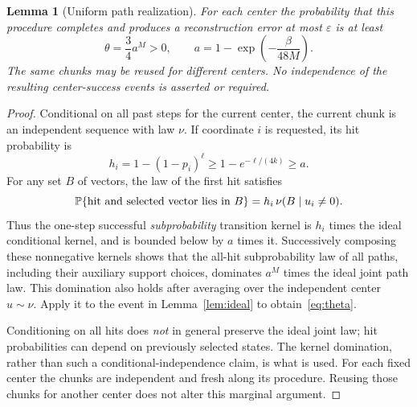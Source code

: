 \documentclass[11pt]{article}
\newtheorem{lemma}[theorem]{Lemma}
\theoremstyle{remark}\newtheorem{remark}[theorem]{Remark}
\begin{document}
\begin{lemma}[Uniform path realization]\label{lem:reservoir}
For each center the probability that this procedure completes and produces a reconstruction error at most $\varepsilon$ is at least
\begin{equation}\label{eq:theta}
 \theta=\frac34 a^M>0,\qquad
 a=1-\exp\left(-\frac{\beta}{48M}\right).
\end{equation}
The same chunks may be reused for different centers. No independence of the resulting center-success events is asserted or required.
\end{lemma}
\begin{proof}
Conditional on all past steps for the current center, the current chunk is an independent sequence with law $\nu$. If coordinate $i$ is requested, its hit probability is
\[
 h_i=1-(1-p_i)^\ell
 \ge1-e^{-\ell/(4k)}\ge a.
\]
For any set $B$ of vectors, the law of the first hit satisfies
\[
 \mathbb P\{\text{hit and selected vector lies in }B\}
 =h_i\,\nu(B\mid u_i\ne0).
\]
Thus the one-step successful \emph{subprobability} transition kernel is $h_i$ times the ideal conditional kernel, and is bounded below by $a$ times it. Successively composing these nonnegative kernels shows that the all-hit subprobability law of all paths, including their auxiliary support choices, dominates $a^M$ times the ideal joint path law. This domination also holds after averaging over the independent center $u\sim\nu$. Apply it to the event in Lemma~\ref{lem:ideal} to obtain~\eqref{eq:theta}.

Conditioning on all hits does \emph{not} in general preserve the ideal joint law; hit probabilities can depend on previously selected states. The kernel domination, rather than such a conditional-independence claim, is what is used. For each fixed center the chunks are independent and fresh along its procedure. Reusing those chunks for another center does not alter this marginal argument.
\end{proof}
\end{document}
